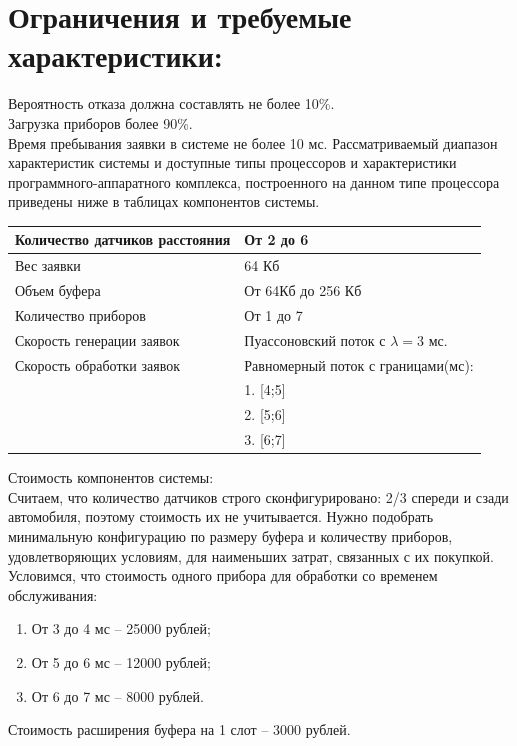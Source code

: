 \documentclass{article}
\begin{document}
	\section{Ограничения и требуемые характеристики:}
	Вероятность отказа должна составлять не более 10\%.\\
	Загрузка приборов более 90\%.\\
	Время пребывания заявки в системе не более 10 мс.
	Рассматриваемый диапазон характеристик системы и доступные типы процессоров и характеристики программного-аппаратного комплекса, построенного на данном типе процессора приведены ниже в таблицах компонентов системы.\\
	\centering
	\begin{tabular}{|p{5.2cm}|p{6.5cm}|}
		\hline
		Количество датчиков расстояния    & От 2 до 6                            \\ \hline
		Вес заявки                & 64 Кб                                \\ \hline
		Объем буфера              & От 64Кб до 256 Кб                    \\ \hline
		Количество приборов       & От 1 до 7                            \\ \hline
		Скорость генерации заявок & Пуассоновский поток с $\lambda = 3$ мс. \\ \hline
		Скорость обработки заявок & Равномерный поток с границами(мс):   \\
		~                         & 1. [4;5]                             \\
		~                         & 2. [5;6]                             \\
		~                         & 3. [6;7]                             \\ \hline
	\end{tabular}
	\flushleft
	Стоимость компонентов системы:\\
	Считаем, что количество датчиков строго сконфигурировано: 2/3 спереди и сзади  автомобиля, поэтому стоимость их не учитывается. Нужно подобрать минимальную конфигурацию по размеру буфера и количеству приборов, удовлетворяющих условиям, для наименьших затрат, связанных с их покупкой. Условимся, что стоимость одного прибора для обработки со временем обслуживания:\\
	\begin{enumerate}
	\item От 3 до 4 мс – 25000 рублей;
	\item От 5 до 6 мс – 12000 рублей;
	\item От 6 до 7 мс – 8000 рублей.
	\end{enumerate}
	Стоимость расширения буфера на 1 слот – 3000 рублей.
	\newpage
\end{document}
